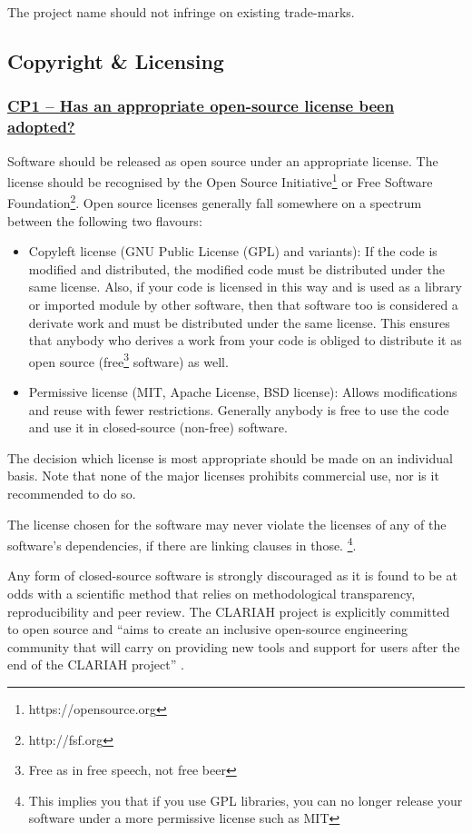 \documentclass[a4paper,11pt]{article}
\newcommand{\indicator}[1]{\subsubsection*{\underline{#1}}}
\begin{document}
The project name should not infringe on existing trade-marks.

\subsection{Copyright \& Licensing}

\indicator{CP1 -- Has an appropriate open-source license been adopted?}

Software should be released as open source under an appropriate license. The
license should be recognised by the Open Source Initiative\footnote{https://opensource.org} or Free Software
Foundation\footnote{http://fsf.org}. Open source licenses generally fall somewhere on a spectrum between the following two flavours:

\begin{itemize}
 \item Copyleft license (GNU Public License (GPL) and variants): If the code is modified and distributed, the modified code must be distributed under the same license. Also, if your code is licensed in this way and is used as a library or imported module by other software, then that software too is considered a derivate work and must be distributed under the same license. This ensures that anybody who derives a work from your code is obliged to distribute it as open source (free\footnote{Free as in free speech, not free beer} software) as well.
 \item Permissive license (MIT, Apache License, BSD license): Allows modifications and reuse with fewer restrictions. Generally anybody is free to use the code and use it in closed-source (non-free) software.
\end{itemize}

The decision which license is most appropriate should be made on an individual
basis. Note that none of the major licenses prohibits commercial use, nor is it
recommended to do so.

The license chosen for the software may never violate the licenses of any of
the software's dependencies, if there are linking clauses in those. \footnote{This implies you that if you use GPL libraries, you can no longer release your software under a more permissive license such as MIT}.

Any form of closed-source software is strongly discouraged as it is found to be
at odds with a scientific method that relies on methodological transparency,
reproducibility and peer review. The CLARIAH project is explicitly committed to
open source and ``aims to create an inclusive open-source engineering community
that will carry on providing new tools and support for users after the end of
the CLARIAH project'' \citep{CLARIAHTECHPLAN1}.
\end{document}
